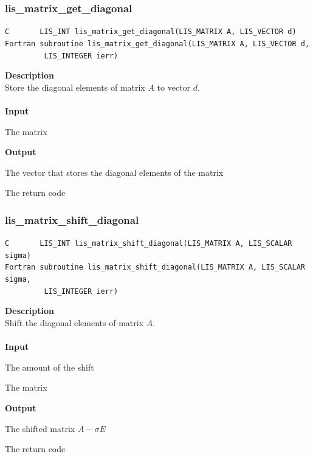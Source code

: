 \documentclass[a4paper]{article}
\newcommand{\namelistlabel}[1]{\mbox{#1}\hfill}
\newenvironment{namelist}[1]{%
\begin{list}{}
  {\let\makelabel\namelistlabel
  \settowidth{\labelwidth}{#1}
  \setlength{\leftmargin}{1.1\labelwidth}}
  }{%
\end{list}}
\begin{document}
\subsubsection{lis\_matrix\_get\_diagonal}
\begin{screen}
\verb|C       LIS_INT lis_matrix_get_diagonal(LIS_MATRIX A, LIS_VECTOR d)|\\
\verb|Fortran subroutine lis_matrix_get_diagonal(LIS_MATRIX A, LIS_VECTOR d,|\\
\verb|         LIS_INTEGER ierr) |
\end{screen}
{\bf Description}\\
\indent
Store the diagonal elements of matrix $A$ to vector $d$.
\\ \\
\noindent
{\bf Input}
\begin{namelist}{XXXXXXXXXXXXXXXXXXXX}
\item[\tt A] The matrix
\end{namelist}
{\bf Output}
\begin{namelist}{XXXXXXXXXXXXXXXXXXXX}
\item[\tt d] The vector that stores the diagonal elements of the matrix
\item[\tt ierr] The return code
\end{namelist}

\newpage
\subsubsection{lis\_matrix\_shift\_diagonal}
\begin{screen}
\verb|C       LIS_INT lis_matrix_shift_diagonal(LIS_MATRIX A, LIS_SCALAR sigma)|\\
\verb|Fortran subroutine lis_matrix_shift_diagonal(LIS_MATRIX A, LIS_SCALAR sigma,|\\
\verb|         LIS_INTEGER ierr) |
\end{screen}
{\bf Description}\\
\indent
Shift the diagonal elements of matrix $A$.
\\ \\
\noindent
{\bf Input}
\begin{namelist}{XXXXXXXXXXXXXXXXXXXX}
\item[\tt sigma] The amount of the shift
\item[\tt A] The matrix
\end{namelist}
{\bf Output}
\begin{namelist}{XXXXXXXXXXXXXXXXXXXX}
\item[\tt A] The shifted matrix $A-\sigma E$
\item[\tt ierr] The return code
\end{namelist}
\end{document}
